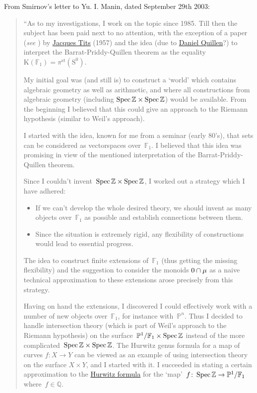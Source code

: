 From Smirnov's letter to Yu. I. Manin, dated September 29th 2003:

\begin{quote}
  ``As to my investigations, I work on the topic since 1985. Till then the subject has been paid next to no attention, with the exception of a paper (\emph{see \cite{sur-les-analogues-algebriques-des-groupes-semi-simples-complexes}}) by \href{http://en.wikipedia.org/wiki/Jacques_Tits}{Jacques Tits} (1957) and the idea (due to \href{http://en.wikipedia.org/wiki/Daniel_Quillen}{Daniel Quillen}?) to interpret the Barrat-Priddy-Quillen theorem as the equality~$\mathrm{K}(\mathbb{F}_1)=\pi^{\mathrm{st}}(\mathrm{S}^0)$.

  My initial goal was (and still is) to construct a `world' which contains algebraic geometry as well as arithmetic, and where all constructions from algebraic geometry (including $\operatorname{Spec}\mathbb{Z}\times\operatorname{Spec}\mathbb{Z}$) would be available. From the beginning I believed that this could give an approach to the Riemann hypothesis (similar to Weil's approach).

  I started with the idea, known for me from a seminar (early 80's), that sets can be considered as vectorspaces over~$\mathbb{F}_1$. I believed that this idea was promising in view of the mentioned interpretation of the Barrat-Priddy-Quillen theorem.

  Since I couldn't invent~$\operatorname{Spec}\mathbb{Z}\times\operatorname{Spec}\mathbb{Z}$, I worked out a strategy which I have adhered:
  \begin{itemize}
    \item If we can't develop the whole desired theory, we should invent as many objects over~$\mathbb{F}_1$ as possible and establish connections between them.
    \item Since the situation is extremely rigid, any flexibility of constructions would lead to essential progress.
  \end{itemize}

  The idea to construct finite extensions of~$\mathbb{F}_1$ (thus getting the missing flexibility) and the suggestion to consider the monoids $0\cap\mathbf{\mu}$ as a naive technical approximation to these extensions arose precisely from this strategy.

  Having on hand the extensions, I discovered I could effectively work with a number of new objects over~$\mathbb{F}_1$, for instance with~$\mathbb{P}^n$. Thus I decided to handle intersection theory (which is part of Weil's approach to the Riemann hypothesis) on the surface~$\mathbb{P}^1/\mathbb{F}_1\times\operatorname{Spec}\mathbb{Z}$ instead of the more complicated~$\operatorname{Spec}\mathbb{Z}\times\operatorname{Spec}\mathbb{Z}$. The Hurwitz genus formula for a map of curves $f\colon X\rightarrow Y$ can be viewed as an example of using intersection theory on the surface $X\times Y$, and I started with it. I succeeded in stating a certain approximation to the \href{http://en.wikipedia.org/wiki/Riemann–Hurwitz_formula}{Hurwitz formula} for the `map'~$f\colon\operatorname{Spec}\mathbb{Z}\to\mathbb{P}^1/\mathbb{F}_1$ where~$f\in\mathbb{Q}$.


\end{quote}
